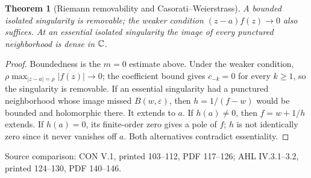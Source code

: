 \documentclass[11pt,a4paper,openany]{book}
\newtheorem{theorem}{Theorem}[chapter]
\theoremstyle{definition}
\theoremstyle{remark}\newtheorem{remark}[theorem]{Remark}
\newcommand{\eps}{\varepsilon}\newcommand{\ee}{\varepsilon}
\newcommand{\family}[1]{}
\newcommand{\source}[1]{\par\begingroup\small\sffamily\color{black!65}Source comparison: #1\par\endgroup}
\begin{document}
\begin{theorem}[Riemann removability and Casorati--Weierstrass]\family{D12.07.03}\label{d12:07-03}
A bounded isolated singularity is removable; the weaker condition
\((z-a)f(z)\to0\) also suffices.
At an essential isolated singularity the image of every punctured
neighborhood is dense in \(\mathbb C\).
\end{theorem}
\begin{proof}
Boundedness is the \(m=0\) estimate above. Under the weaker condition,
\(\rho\max_{|z-a|=\rho}|f(z)|\to0\); the coefficient bound gives
\(c_{-k}=0\) for every \(k\ge1\), so the singularity is removable.
If an essential singularity had a punctured neighborhood whose image
missed \(B(w,\eps)\), then \(h=1/(f-w)\) would be bounded and
holomorphic there. It extends to \(a\). If \(h(a)\ne0\), then
\(f=w+1/h\) extends. If \(h(a)=0\), its finite-order zero gives a
pole of \(f\); \(h\) is not identically zero since it never vanishes
off \(a\). Both alternatives contradict essentiality.
\end{proof}
\source{CON V.1, printed 103--112, PDF 117--126; AHL IV.3.1--3.2, printed 124--130, PDF 140--146.}
\end{document}
